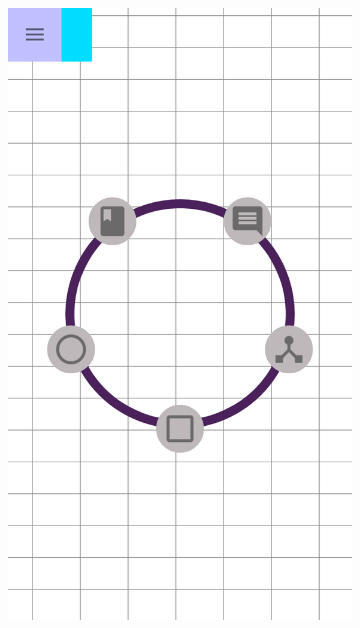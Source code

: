 \begin{figure}[!h]
\begin{subfigure}[t]{.3\textwidth}
				\includegraphics[width=\textwidth]{img/screen/colladia_draw_view_menu_contextuel_main}
			\end{subfigure}
			~
			\begin{subfigure}[t]{.3\textwidth}

\end{subfigure}
\end{figure}
